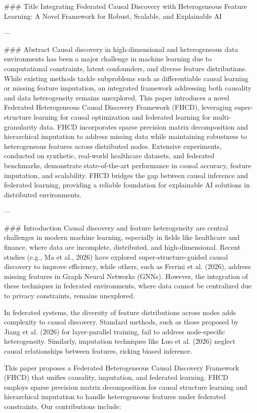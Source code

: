 ### Title  
Integrating Federated Causal Discovery with Heterogeneous Feature Learning: A Novel Framework for Robust, Scalable, and Explainable AI  

---

### Abstract  
Causal discovery in high-dimensional and heterogeneous data environments has been a major challenge in machine learning due to computational constraints, latent confounders, and diverse feature distributions. While existing methods tackle subproblems such as differentiable causal learning or missing feature imputation, an integrated framework addressing both causality and data heterogeneity remains unexplored. This paper introduces a novel Federated Heterogeneous Causal Discovery Framework (FHCD), leveraging super-structure learning for causal optimization and federated learning for multi-granularity data. FHCD incorporates sparse precision matrix decomposition and hierarchical imputation to address missing data while maintaining robustness to heterogeneous features across distributed nodes. Extensive experiments, conducted on synthetic, real-world healthcare datasets, and federated benchmarks, demonstrate state-of-the-art performance in causal accuracy, feature imputation, and scalability. FHCD bridges the gap between causal inference and federated learning, providing a reliable foundation for explainable AI solutions in distributed environments.  

---

### Introduction  
Causal discovery and feature heterogeneity are central challenges in modern machine learning, especially in fields like healthcare and finance, where data are incomplete, distributed, and high-dimensional. Recent studies (e.g., Ma et al., 2026) have explored super-structure-guided causal discovery to improve efficiency, while others, such as Ferrini et al. (2026), address missing features in Graph Neural Networks (GNNs). However, the integration of these techniques in federated environments, where data cannot be centralized due to privacy constraints, remains unexplored.  

In federated systems, the diversity of feature distributions across nodes adds complexity to causal discovery. Standard methods, such as those proposed by Jiang et al. (2026) for layer-parallel training, fail to address node-specific heterogeneity. Similarly, imputation techniques like Luo et al. (2026) neglect causal relationships between features, risking biased inference.  

This paper proposes a Federated Heterogeneous Causal Discovery Framework (FHCD) that unifies causality, imputation, and federated learning. FHCD employs sparse precision matrix decomposition for causal structure learning and hierarchical imputation to handle heterogeneous features under federated constraints. Our contributions include:  

